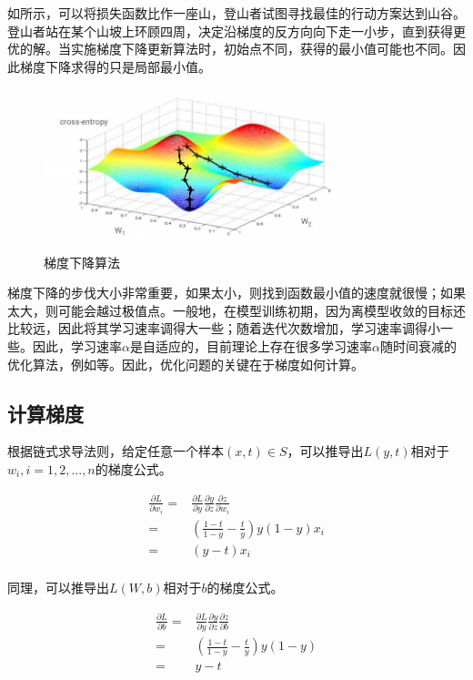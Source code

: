 \begin{content}
如所示，可以将损失函数比作一座山，登山者试图寻找最佳的行动方案达到山谷。登山者站在某个山坡上环顾四周，决定沿梯度的反方向向下走一小步，直到获得更优的解。当实施梯度下降更新算法时，初始点不同，获得的最小值可能也不同。因此梯度下降求得的只是局部最小值。

\begin{figure}[H]
\centering
\includegraphics[width=0.8\textwidth]{figures/mnist-gd.jpeg}
\caption{梯度下降算法}
 \label{fig:mnist-gd}
\end{figure}

梯度下降的步伐大小非常重要，如果太小，则找到函数最小值的速度就很慢；如果太大，则可能会越过极值点。一般地，在模型训练初期，因为离模型收敛的目标还比较远，因此将其学习速率调得大一些；随着迭代次数增加，学习速率调得小一些。因此，学习速率$\alpha$是自适应的，目前理论上存在很多学习速率$\alpha$随时间衰减的优化算法，例如等。因此，优化问题的关键在于梯度如何计算。

\subsection{计算梯度}

根据链式求导法则，给定任意一个样本$ (x,t) \in S $，可以推导出$ L(y, t) $相对于$ w_i, i=1,2,...,n $的梯度公式。

\[\begin{aligned}
  \frac{{\partial L}}{{\partial {w_i}}}
   =  & \frac{{\partial L}}{{\partial y}}\frac{{\partial y}}{{\partial z}}\frac{{\partial z}}{{\partial {w_i}}} \\ 
   =  & \left( {\frac{{1 - t}}{{1 - y}} - \frac{t}{y}} \right)y(1 - y){x_i} \\ 
   =  & (y - t){x_i} \\ 
\end{aligned} \]

同理，可以推导出$ L(W,b) $相对于$ b $的梯度公式。

\[\begin{aligned}
  \frac{{\partial L}}{{\partial b}} 
   =  & \frac{{\partial L}}{{\partial y}}\frac{{\partial y}}{{\partial z}}\frac{{\partial z}}{{\partial b}} \\ 
   =  & \left( {\frac{{1 - t}}{{1 - y}} - \frac{t}{y}} \right)y(1 - y) \\ 
   =  & y - t \\ 
\end{aligned} \]


\end{content}
